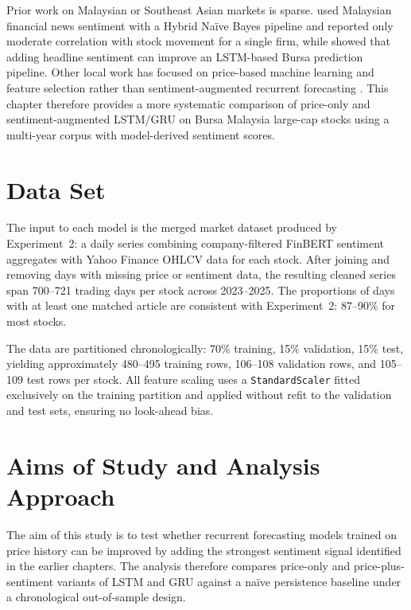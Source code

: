 \documentclass[12pt]{ucetd}
\begin{document}
Prior work on Malaysian or Southeast Asian markets is sparse. \citet{cheng2019malaysian} used Malaysian financial news sentiment with a Hybrid Na\"ive Bayes pipeline and reported only moderate correlation with stock movement for a single firm, while \citet{sidek2023bursa} showed that adding headline sentiment can improve an LSTM-based Bursa prediction pipeline. Other local work has focused on price-based machine learning and feature selection rather than sentiment-augmented recurrent forecasting \cite{leong2021stock, tengku2022prediction, ku2023improving, chia2023predictive}. This chapter therefore provides a more systematic comparison of price-only and sentiment-augmented LSTM/GRU on Bursa Malaysia large-cap stocks using a multi-year corpus with model-derived sentiment scores.

\section{Data Set}

The input to each model is the merged market dataset produced by Experiment~2: a daily series combining company-filtered FinBERT sentiment aggregates with Yahoo Finance OHLCV data for each stock. After joining and removing days with missing price or sentiment data, the resulting cleaned series span 700--721 trading days per stock across 2023--2025. The proportions of days with at least one matched article are consistent with Experiment~2: 87--90\% for most stocks.

The data are partitioned chronologically: 70\% training, 15\% validation, 15\% test, yielding approximately 480--495 training rows, 106--108 validation rows, and 105--109 test rows per stock. All feature scaling uses a \texttt{StandardScaler} fitted exclusively on the training partition and applied without refit to the validation and test sets, ensuring no look-ahead bias.

\section{Aims of Study and Analysis Approach}

The aim of this study is to test whether recurrent forecasting models trained on price history can be improved by adding the strongest sentiment signal identified in the earlier chapters. The analysis therefore compares price-only and price-plus-sentiment variants of LSTM and GRU against a na\"ive persistence baseline under a chronological out-of-sample design.
\end{document}
